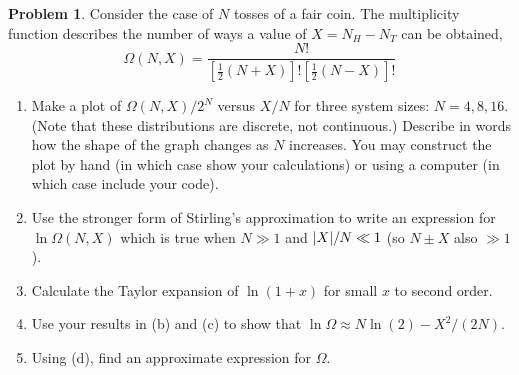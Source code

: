 \documentclass[10pt]{article}
\theoremstyle{definition}
\newtheorem{problem}{Problem}
\begin{document}
\begin{problem}Consider the case of $N$ tosses of a fair coin. The multiplicity function describes the
number of ways a value of $X = N_H - N_T$ can be obtained,
$$\Omega(N,X)=\frac{N!}{\left[\frac{1}{2}\left(N+X\right)\right]!
    \left[\frac{1}{2}\left(N-X\right)\right]!}$$
\begin{enumerate}[label=(\alph*)]
  \item Make a plot of $\Omega(N, X)/2^N$ versus $X/N$ for three system sizes: $N = 4, 8, 16$. (Note that
        these distributions are discrete, not continuous.) Describe in words how the shape of the
        graph changes as $N$ increases. You may construct the plot by hand (in which case show your
        calculations) or using a computer (in which case include your code).
  \item Use the stronger form of Stirling's approximation to write an expression for $\ln \Omega(N, X)$
        which is true when $N \gg 1$ and $\abs{X}/N \ll 1$ (so $N \pm X$ also $\gg 1$).
  \item Calculate the Taylor expansion of $\ln(1 + x)$ for small $x$ to second order.
  \item Use your results in (b) and (c) to show that $\ln \Omega \approx N\ln(2)-X^2/(2N)$.
  \item Using (d), find an approximate expression for $\Omega$.
\end{enumerate}
\end{problem}
\end{document}
